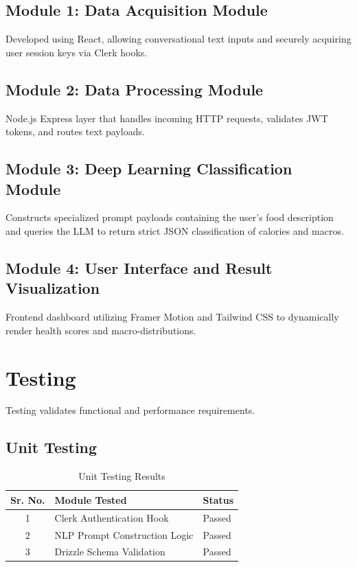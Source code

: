 \documentclass[12pt,a4paper]{report}
\begin{document}
\subsection{Module 1: Data Acquisition Module}
Developed using React, allowing conversational text inputs and securely acquiring user session keys via Clerk hooks.

\subsection{Module 2: Data Processing Module}
Node.js Express layer that handles incoming HTTP requests, validates JWT tokens, and routes text payloads.

\subsection{Module 3: Deep Learning Classification Module}
Constructs specialized prompt payloads containing the user's food description and queries the LLM to return strict JSON classification of calories and macros.

\subsection{Module 4: User Interface and Result Visualization}
Frontend dashboard utilizing Framer Motion and Tailwind CSS to dynamically render health scores and macro-distributions.

\section{Testing}
Testing validates functional and performance requirements.

\subsection{Unit Testing}
\begin{table}[H]
\centering
\begin{tabular}{|c|l|l|}
\hline
\textbf{Sr. No.} & \textbf{Module Tested} & \textbf{Status} \\ \hline
1 & Clerk Authentication Hook & Passed \\ \hline
2 & NLP Prompt Construction Logic & Passed \\ \hline
3 & Drizzle Schema Validation & Passed \\ \hline
\end{tabular}
\caption{Unit Testing Results}
\end{table}
\end{document}
